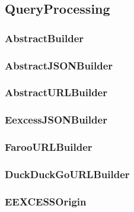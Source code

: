 
\subsection{QueryProcessing}
\subsubsection{AbstractBuilder}
\subsubsection{AbstractJSONBuilder}
\subsubsection{AbstractURLBuilder}
\subsubsection{EexcessJSONBuilder}
\subsubsection{FarooURLBuilder}
\subsubsection{DuckDuckGoURLBuilder}
\subsubsection{EEXCESSOrigin}

